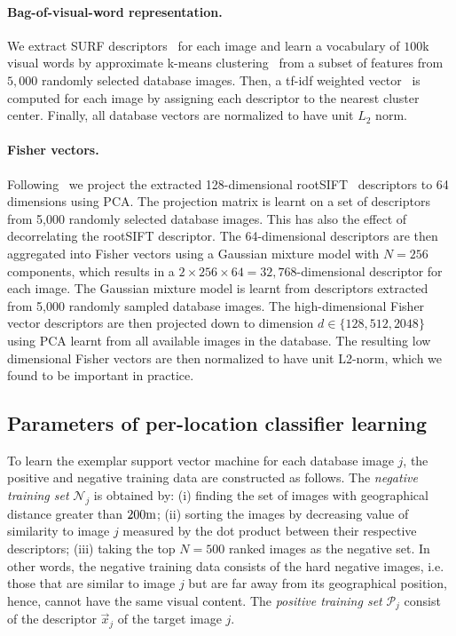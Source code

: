       \paragraph{Bag-of-visual-word representation.}
         We extract SURF descriptors~\cite{Bay06} for each image and learn a vocabulary of $100$k visual words by approximate k-means clustering~\cite{Philbin07} from a subset of features from $5,000$ randomly selected database images. Then, a tf-idf weighted vector~\cite{Sivic03} is computed for each image by assigning each descriptor to the nearest cluster center.  Finally, all database vectors are normalized to have unit $L_2$ norm.
        
      \paragraph{Fisher vectors.}
        Following~\cite{Jegou12} we project the extracted 128-dimensional rootSIFT~\cite{Arandjelovic12} descriptors to 64 dimensions using PCA. The projection matrix is learnt on a set of descriptors from 5,000 randomly selected database images. This has also the effect of decorrelating the rootSIFT descriptor. The 64-dimensional descriptors are then aggregated into Fisher vectors using a Gaussian mixture model with $N=256$ components, which results in a $2\times256\times64 = 32,768$-dimensional descriptor for each image.  
        The Gaussian mixture model is learnt from descriptors extracted from 5,000 randomly sampled database images. The  high-dimensional Fisher vector descriptors are then projected down to dimension $d\in\{128,512, 2048\}$ using PCA learnt from all available images in the database. The resulting low dimensional Fisher vectors are then normalized to have unit L2-norm, which we found to be important in practice.
      
    \subsection{Parameters of per-location classifier learning}
      To learn the exemplar support vector machine for each database image $j$, the positive and negative training data are constructed as follows. 
      The \emph{negative training set} $\mathcal N_j$ is obtained by: (i) finding the set of images with geographical distance greater than $200{\rm m}$; (ii)  sorting the images by decreasing value of similarity to image $j$ measured by the dot product between their respective descriptors; (iii) taking the top $N=500$ ranked images as the negative set. 
      In other words, the negative training data consists of the hard negative images, i.e. those that are similar to image $j$ but are far away from its geographical position, hence, cannot have the same visual content. 
      The \emph{positive training set} $\mathcal P_j$ consist of the descriptor $\vec{x}_j$ of the target image $j$. 
      
